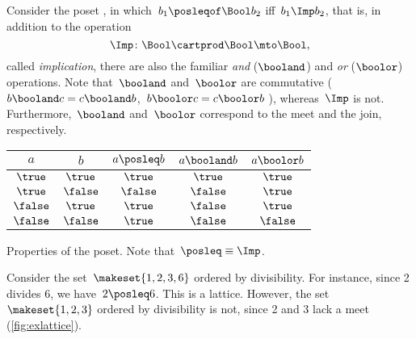 \begin{example}
    Consider the poset \Bool, in which~$b_1 \posleqof\Bool b_2$ iff~$b_1 \Imp b_2$, that is, in addition to the operation
    \begin{equation}
        \Imp\colon\Bool\cartprod \Bool\mto\Bool,
    \end{equation}
    called \emph{implication}, there are also the familiar \emph{and} ($\booland$) and \emph{or} ($\boolor$) operations.
    Note that~$\booland$ and~$\boolor$ are commutative ($b\booland c = c\booland b$,~$b\boolor c = c\boolor b$ ), whereas~$\Imp$ is not.
    Furthermore,~$\booland$ and~$\boolor$ correspond to the meet and the join, respectively.

    \begin{margintable}
        \centering
        \begin{tabular}{cc|ccc}
            $a$      & $b$      & $a \posleq  b$ & $a \booland b$ & $a \boolor b$ \\ \hline
            $\true$  & $\true$  & $\true$        & $\true$        & $\true$ \\
            $\true$  & $\false$ & $\false$       & $\false$       & $\true$ \\
            $\false$ & $\true$  & $\true$        & $\false$       & $\true$ \\
            $\false$ & $\false$ & $\true$        & $\false$       & $\false$
        \end{tabular}
        \caption{Properties of the \Bool poset.
            Note that~$\posleq \equiv \Imp$.
        }
        \label{tab:boolposet}
    \end{margintable}
\end{example}

\begin{example}
    Consider the set~$\makeset{1,2,3,6}$ ordered by divisibility.
    For instance, since 2 divides 6, we have~$2\posleq 6$.
    This is a lattice.
    However, the set~$\makeset{1,2,3}$ ordered by divisibility is not, since 2 and 3 lack a meet (\cref{fig:exlattice}).
\end{example}

